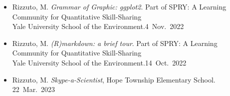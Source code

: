 
\begin{itemize}
  \item \textcolor{awesome}{Rizzuto, M.} \emph{Grammar of Graphic: ggplot2}. Part of SPRY: A Learning Community for Quantitative Skill-Sharing\\ Yale University School of the Environment.\hfill 4~Nov.~2022
  \item \textcolor{awesome}{Rizzuto, M.} \emph{(R)markdown: a brief tour}. Part of SPRY: A Learning Community for Quantitative Skill-Sharing\\ Yale University School of the Environment.\hfill 14~Oct.~2022
\end{itemize}

\begin{itemize}
  \item \textcolor{awesome}{Rizzuto, M.} \emph{Skype-a-Scientist}, Hope Township Elementary School. \hfill 22~Mar.~2023
\end{itemize}

